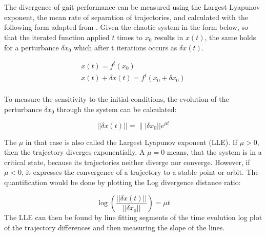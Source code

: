 \documentclass[main]{subfiles}
\begin{document}
\chapter{} %

\label{AppendixA} %

The divergence of gait performance can be measured using the Largest Lyapunov exponent, the mean rate of separation of trajectories, and calculated with the following form adapted from \cite{bib:Rosenstein1993}. %
%
Given the chaotic system in the form below, so that the iterated function applied \(t\) times to \(x_0\) results in \(x(t)\), the same holds for a perturbance \(\delta x_0\) which after t iterations occurs as \(\delta x(t)\).

\begin{align*}
x(t) = f^t(x_0)\\
x(t) + \delta x(t) = f^t(x_0 + \delta x_0)\\
\end{align*}

To measure the sensitivity to the initial conditions, the evolution of the perturbance \(\delta x_0\) through the system can be calculated:

\[||\delta x(t)|| = \||\delta x_0|| e^{\mu t}\]

The \(\mu\) in that case is also called the Largest Lyapunov exponent (LLE). %
%
If \(\mu > 0\), then the trajectory diverges exponentially. %
%
A \(\mu = 0\) means, that the system is in a critical state, because its trajectories neither diverge nor converge. %
%
However, if \(\mu < 0\), it expresses the convergence of a trajectory to a stable point or orbit. %
%
The quantification would be done by plotting the Log divergence distance ratio:

\[\log\left(\frac{||\delta x(t)||}{||\delta x_0||}\right) = \mu t\]
%
The LLE can then be found by line fitting segments of the time evolution log plot of the trajectory differences and then measuring the slope of the lines. %
\end{document}

